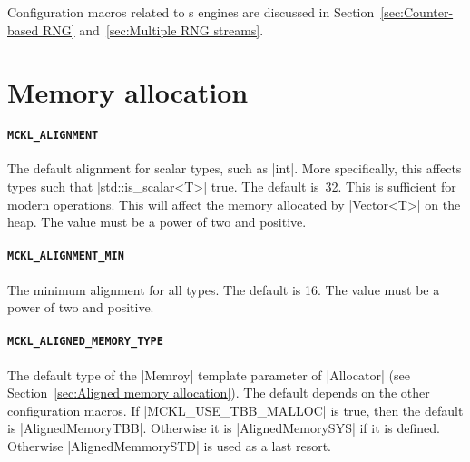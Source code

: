 Configuration macros related to \rng{}s engines are discussed in
Section~\ref{sec:Counter-based RNG} and~\ref{sec:Multiple RNG streams}.

\section{Memory allocation}
\label{sec:Memory allocation}

\paragraph{\texttt{MCKL\_ALIGNMENT}} The default alignment for scalar types,
such as |int|. More specifically, this affects types such that
|std::is_scalar<T>| true. The default is~32. This is sufficient for modern
\simd operations. This will affect the memory allocated by |Vector<T>| on the
heap. The value must be a power of two and positive.

\paragraph{\texttt{MCKL\_ALIGNMENT\_MIN}} The minimum alignment for all types.
The default is 16. The value must be a power of two and positive.

\paragraph{\texttt{MCKL\_ALIGNED\_MEMORY\_TYPE}} The default type of the
|Memroy| template parameter of |Allocator| (see Section~\ref{sec:Aligned memory
allocation}). The default depends on the other configuration macros. If
|MCKL_USE_TBB_MALLOC| is true, then the default is |AlignedMemoryTBB|.
Otherwise it is |AlignedMemorySYS| if it is defined. Otherwise
|AlignedMemmorySTD| is used as a last resort.

